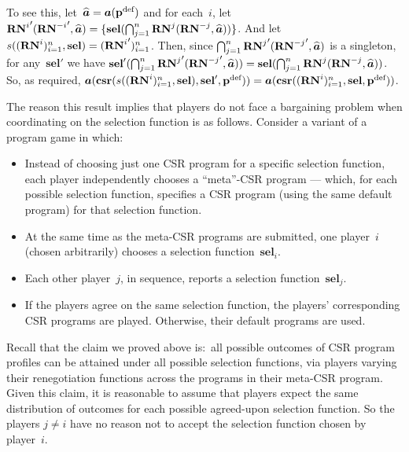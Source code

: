 \documentclass[sigconf]{aamas}
\newcommand{\selection}{sel}%
\newcommand{\renegb}{\mathbf{\selection}}
\theoremstyle{definition}
\begin{document}
To see this, let~$\widehat{\boldsymbol{a}} = \boldsymbol{a}({\textbf{p}}^{\textnormal{def}})$ and for each~$i$, let~${\renegi}'({\renegmi}', \deffullact) = \{\renegb(\bigcap_{j=1}^n \renegj(\renegmj, \deffullact))\}$.
And let~$\genfunc((\renegi)\indices, \renegb) = ({\renegi}')\indices$.
Then, since $\bigcap_{j=1}^n {\mathbf{RN}^{j}}'({\mathbf{RN}^{-j}}', \widehat{\boldsymbol{a}})$
is a singleton, for any~$\renegb'$ we have
$\renegb'(\bigcap_{j=1}^n {\renegj}'({\renegmj}', \deffullact)) = \renegb(\bigcap_{j=1}^n {\renegj}({\renegmj}, \deffullact))$.
So, as required,
$\fullact(\csprog(\genfunc((\renegi)\indices, \renegb), \renegb', \deffullprog)) = \fullact(\csprog((\renegi)\indices, \renegb, \deffullprog))$.

The reason this result implies
that players do not face a
bargaining problem
when coordinating on
the selection function is as follows.
Consider a variant of a program
game in which:
\begin{itemize}
    \item Instead of choosing just one CSR
    program for a specific selection function,
    each player
    independently
    chooses a ``meta''-CSR program --- which,
    for each possible selection function,
    specifies a CSR
    program (using the same default program)
    for that selection function.
    \item At the same time as the meta-CSR programs are submitted,
    one player~$i$ (chosen arbitrarily)
    chooses a selection function~$\renegb_i$.
    \item Each other player~$j$, in sequence, reports a selection function~$\renegb_j$.
    \item If the players agree on the same selection function,
    the players' corresponding
    CSR programs are played. Otherwise, their default programs are used.
\end{itemize}
Recall
that the claim we proved above
is:\ all possible outcomes
of CSR program profiles can be attained under
all possible selection functions,
via players varying their renegotiation functions
across the programs in their
meta-CSR program.
Given this claim,
it is reasonable to assume that players 
expect the same distribution
of outcomes
for each possible 
agreed-upon
selection function.
So the players $j \neq i$
have no reason not to accept the selection function
chosen by player~$i$.


\end{document}
